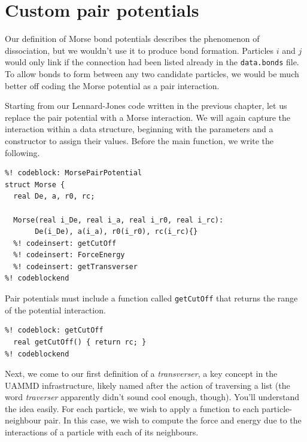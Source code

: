\section{Custom pair potentials}

Our definition of Morse bond potentials describes the phenomenon of
dissociation, but we wouldn't use it to produce bond formation. Particles $i$
and $j$ would only link if the connection had been listed already in the
\texttt{data.bonds} file. To allow bonds to form between any two candidate
particles, we would be much better off coding the Morse potential as a pair
interaction.

Starting from our Lennard-Jones code written in the previous chapter, let us 
replace the pair potential with a Morse interaction. We will again capture the
interaction within a data structure, beginning with the parameters and a 
constructor to assign their values. Before the main function, we write the 
following.
\begin{lstlisting}
%! codeblock: MorsePairPotential
struct Morse {
  real De, a, r0, rc;

  Morse(real i_De, real i_a, real i_r0, real i_rc):
       De(i_De), a(i_a), r0(i_r0), rc(i_rc){}
  %! codeinsert: getCutOff
  %! codeinsert: ForceEnergy
  %! codeinsert: getTransverser
%! codeblockend
\end{lstlisting}
Pair potentials must include a function called \texttt{getCutOff} that returns
the range of the potential interaction.
\begin{lstlisting}
%! codeblock: getCutOff
  real getCutOff() { return rc; }
%! codeblockend
\end{lstlisting}

Next, we come to our first definition of a \textit{transverser}, a key concept 
in the UAMMD infrastructure, likely named after the action of traversing a list 
(the word \textit{traverser} apparently didn't sound cool enough, though). 
You'll understand the idea easily. For each particle, we wish to apply a 
function to each particle-neighbour pair. In this case, we wish to compute the 
force and energy due to the interactions of a particle with each of its 
neighbours.

